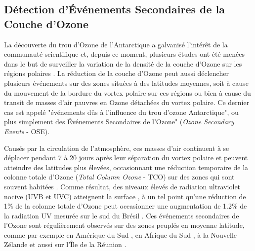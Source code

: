 \subsection{Détection d'Événements Secondaires de la Couche d'Ozone\label{subsec:ozone}}

La découverte du trou d'Ozone de l'Antarctique \cite{Farman1985} a galvanisé l'intérêt de la communauté scientifique et, depuis ce moment, plusieurs études ont été menées dans le but de surveiller la variation de la densité de la couche d'Ozone sur les régions polaires \cite{Solomon1999}\cite{Salby2012}. La réduction de la couche d'Ozone peut aussi déclencher plusieurs événements sur des zones situées à des latitudes moyennes, soit à cause du mouvement de la bordure du vortex polaire sur ces régions  \cite{Kirchhoff1997}\cite{Marchand2005} ou bien à cause du transit de masses d'air pauvres en Ozone détachées du vortex polaire. Ce dernier cas est appelé "événements dûs à l'influence du trou d'ozone Antarctique", ou plus simplement des Événements Secondaires de l'Ozone" (\textit{Ozone Secondary Events}  - OSE). 

Causés par la circulation de l'atmosphère, ces masses d'air continuent à se déplacer pendant 7 à 20 jours après leur séparation du vortex polaire et peuvent atteindre des latitudes plus élevées, occasionnant une réduction temporaire de la colonne totale d'Ozone (\textit{Total Column Ozone} - TCO) sur des zones qui sont souvent habitées \cite{Prather1990}\cite{Waugh1994}\cite{Manney1994}. Comme résultat, des niveaux élevés de radiation ultraviolet nocive (UVB et UVC) atteignent la surface \cite{Casiccia2008}, à un tel point qu'une réduction de 1\% de la colonne totale d'Ozone peut occasionner une augmentation de 1.2\% de la radiation UV mesurée sur le sud du Brésil \cite{Guarnieri2004}. Ces événements secondaires de l'Ozone sont régulièrement observés sur des zones peuplés en moyenne latitude, comme par exemple en Amérique du Sud \cite{Kirschhoff1996}\cite{Pinheiro2011}, en Afrique du Sud \cite{Semane2006}\cite{Sivakumar2007}, à la Nouvelle Zélande \cite{Brinksma1998} et aussi sur l'Île de la Réunion \cite{toihir2015}. 


